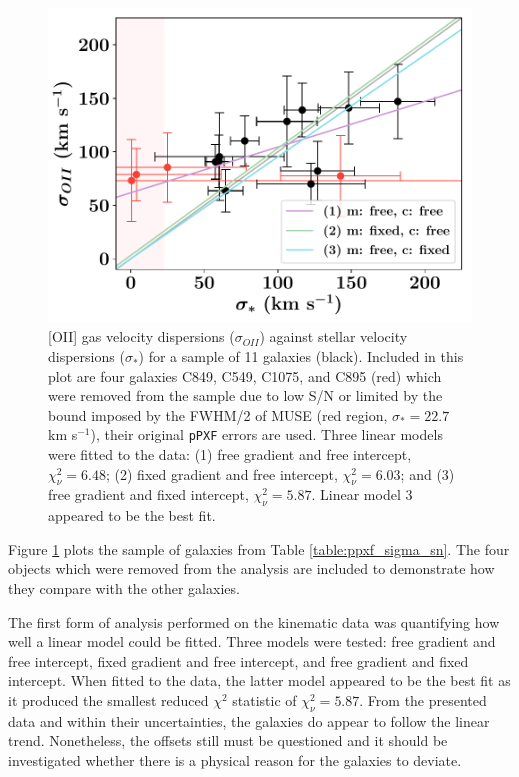 \documentclass[12pt, twocolumn, nofootinbib]{revtex4-1}    %
\begin{document}
\begin{figure}
\includegraphics[width=1.0\linewidth]{data/sigma_star_vs_sigma_oii}
\caption{[OII] gas velocity dispersions ($\sigma_{OII}$) against stellar velocity dispersions ($\sigma_*$) for a sample of 11 galaxies (black). Included in this plot are four galaxies C849, C549, C1075, and C895 (red) which were removed from the sample due to low S/N or limited by the bound imposed by the FWHM/2 of MUSE (red region, $\sigma_*=22.7$ km s$^{-1}$), their original \texttt{pPXF} errors are used. Three linear models were fitted to the data: (1) free gradient and free intercept, $\chi^2_{\nu}=6.48$; (2) fixed gradient and free intercept, $\chi^2_\nu=6.03$; and (3) free gradient and fixed intercept, $\chi^2_\nu=5.87$. Linear model 3 appeared to be the best fit.}
\label{fig:velocity_dispersions}
\end{figure}

Figure \ref{fig:velocity_dispersions} plots the sample of galaxies from Table \ref{table:ppxf_sigma_sn}. The four objects which were removed from the analysis are included to demonstrate how they compare with the other galaxies. 

The first form of analysis performed on the kinematic data was quantifying how well a linear model could be fitted. Three models were tested: free gradient and free intercept, fixed gradient and free intercept, and free gradient and fixed intercept. When fitted to the data, the latter model appeared to be the best fit as it produced the smallest reduced $\chi^2$ statistic of $\chi^2_\nu=5.87$. From the presented data and within their uncertainties, the galaxies do appear to follow the linear trend. Nonetheless, the offsets still must be questioned and it should be investigated whether there is a physical reason for the galaxies to deviate. 
\end{document}
